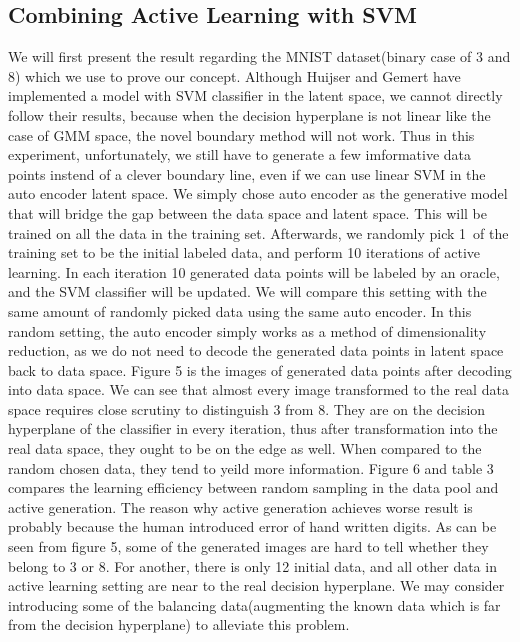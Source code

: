 \documentclass[10pt,twocolumn,letterpaper]{article}
\begin{document}
\subsection{Combining Active Learning with SVM}
We will first present the result regarding the MNIST dataset(binary case of 3 and 8) which we use to prove our concept. Although Huijser and Gemert have implemented a model with SVM classifier in the latent space\cite{huijser2017active}, we cannot directly follow their results, because when the decision hyperplane is not linear like the case of GMM space, the novel boundary method will not work. Thus in this experiment, unfortunately, we still have to generate a few imformative data points instend of a clever boundary line, even if we can use linear SVM in the auto encoder latent space. We simply chose auto encoder as the generative model that will bridge the gap between the data space and latent space. This will be trained on all the data in the training set. Afterwards, we randomly pick 1\textperthousand \ of the training set to be the initial labeled data, and perform 10 iterations of active learning. In each iteration 10 generated data points will be labeled by an oracle, and the SVM classifier will be updated. We will compare this setting with the same amount of randomly picked data using the same auto encoder. In this random setting, the auto encoder simply works as a method of dimensionality reduction, as we do not need to decode the generated data points in latent space back to data space. Figure 5 is the images of generated data points after decoding into data space. We can see that almost every image transformed to the real data space requires close scrutiny to distinguish 3 from 8. They are on the decision hyperplane of the classifier in every iteration, thus after transformation into the real data space, they ought to be on the edge as well. When compared to the random chosen data, they tend to yeild more information. Figure 6 and table 3 compares the learning efficiency between random sampling in the data pool and active generation. The reason why active generation achieves worse result is probably because the human introduced error of hand written digits. As can be seen from figure 5, some of the generated images are hard to tell whether they belong to 3 or 8. For another, there is only 12 initial data, and all other data in active learning setting are near to the real decision hyperplane. We may consider introducing some of the balancing data(augmenting the known data which is far from the decision hyperplane) to alleviate this problem.
\end{document}
